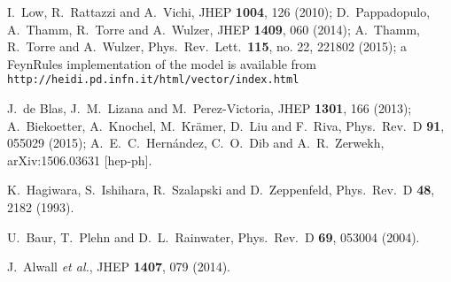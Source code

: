   I.~Low, R.~Rattazzi and A.~Vichi,
  JHEP {\bf 1004}, 126 (2010);
  D.~Pappadopulo, A.~Thamm, R.~Torre and A.~Wulzer,
  JHEP {\bf 1409}, 060 (2014); 
  A.~Thamm, R.~Torre and A.~Wulzer,
  Phys.\ Rev.\ Lett.\  {\bf 115}, no. 22, 221802 (2015);
  a FeynRules implementation
  of the model is available from 
  \texttt{http://heidi.pd.infn.it/html/vector/index.html}

  J.~de Blas, J.~M.~Lizana and M.~Perez-Victoria,
  JHEP {\bf 1301}, 166 (2013);
  A.~Biekoetter, A.~Knochel, M.~Kr\"amer, D.~Liu and F.~Riva,
  Phys.\ Rev.\ D {\bf 91}, 055029 (2015);
  A.~E.~C.~Hern\'andez, C.~O.~Dib and A.~R.~Zerwekh,
  arXiv:1506.03631 [hep-ph].

  K.~Hagiwara, S.~Ishihara, R.~Szalapski and D.~Zeppenfeld,
  Phys.\ Rev.\ D {\bf 48}, 2182 (1993).
  
  U.~Baur, T.~Plehn and D.~L.~Rainwater,
  Phys.\ Rev.\ D {\bf 69}, 053004 (2004).
 
  J.~Alwall {\it et al.},
  JHEP {\bf 1407}, 079 (2014).

